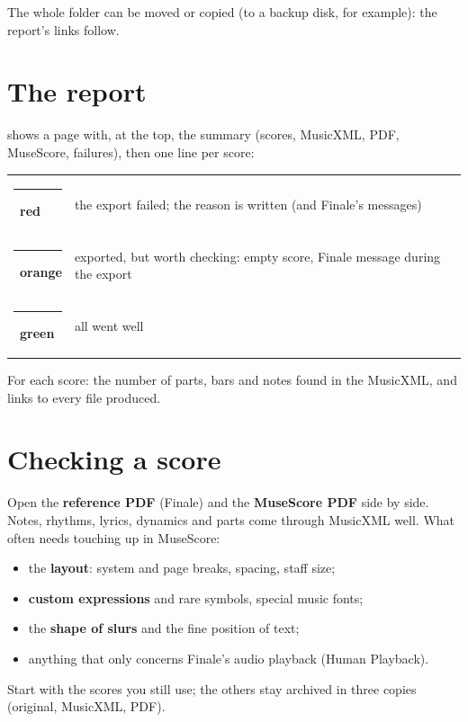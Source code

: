 The whole folder can be moved or copied (to a backup disk, for example): the report's links follow.

\section{The report}

 shows a page with, at the top, the summary (scores, MusicXML, PDF, MuseScore,
failures), then one line per score:

\begin{center}
\renewcommand{\arraystretch}{1.35}
\begin{tabularx}{\linewidth}{l X}
\toprule
\textcolor{alert}{\rule{4pt}{9pt}}\ \textbf{red} & the export failed; the reason is written (and Finale's messages) \\
\textcolor{or}{\rule{4pt}{9pt}}\ \textbf{orange} & exported, but worth checking: empty score, Finale message during the export \\
\textcolor{sapin}{\rule{4pt}{9pt}}\ \textbf{green} & all went well \\
\bottomrule
\end{tabularx}
\end{center}

For each score: the number of parts, bars and notes found in the MusicXML, and links to every file
produced.

\section{Checking a score}

Open the \textbf{reference PDF} (Finale) and the \textbf{MuseScore PDF} side by side. Notes,
rhythms, lyrics, dynamics and parts come through MusicXML well. What often needs touching up in
MuseScore:
\begin{itemize}
\item the \textbf{layout}: system and page breaks, spacing, staff size;
\item \textbf{custom expressions} and rare symbols, special music fonts;
\item the \textbf{shape of slurs} and the fine position of text;
\item anything that only concerns Finale's audio playback (Human Playback).
\end{itemize}
Start with the scores you still use; the others stay archived in three copies (original, MusicXML,
PDF).


